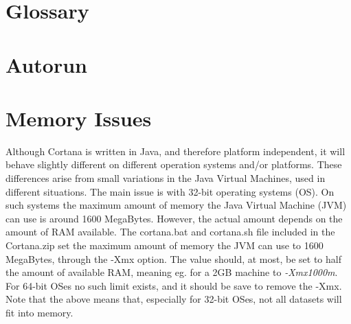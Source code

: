 \documentclass{article}
\begin{document}
\section{Glossary}
\vspace{-10mm}
\renewcommand*{\glossaryname}{}
\printglossaries

\section{Autorun}

\section{Memory Issues}
\label{sec:memory}

Although Cortana is written in Java, and therefore platform independent, it will behave slightly different on different operation systems and/or platforms.
These differences arise from small variations in the Java Virtual Machines, used in different situations.
The main issue is with 32-bit operating systems (OS).
On such systems the maximum amount of memory the Java Virtual Machine (JVM) can use is around 1600 MegaBytes.
However, the actual amount depends on the amount of RAM available.
The cortana.bat and cortana.sh file included in the Cortana.zip set the maximum amount of memory the JVM can use to 1600 MegaBytes, through the -Xmx option.
The value should, at most, be set to half the amount of available RAM, meaning eg. for a 2GB machine to \emph{-Xmx1000m}.
For 64-bit OSes no such limit exists, and it should be save to remove the -Xmx.
Note that the above means that, especially for 32-bit OSes, not all datasets will fit into memory.
\end{document}
